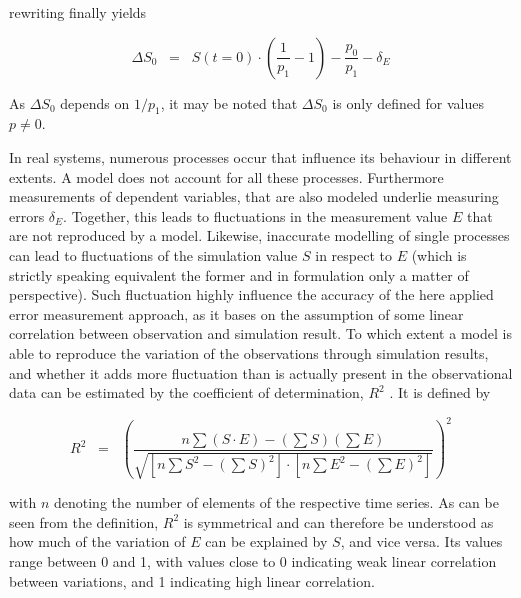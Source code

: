 \noindent rewriting finally yields

\begin{equation}
    \label{Eq-ErrMethDS0}
    \Delta S_0 \; \; = \; \; S(t\!=\!0) \cdot \left( \frac{1}{p_1} - 1 \right) - \frac{p_0}{p_1} - \delta_E
\end{equation}

As $\Delta S_0$ depends on $1/p_1$, it may be noted that $\Delta S_0$ is only defined for values $p \neq 0$.

In real systems, numerous processes occur that influence its behaviour in different extents. 
A model does not account for all these processes. 
Furthermore measurements of dependent variables, that are also modeled underlie measuring errors $\delta_E$. 
Together, this leads to fluctuations in the measurement value $E$ that are not reproduced by a model. 
Likewise, inaccurate modelling of single processes can lead to fluctuations of the simulation value $S$ in respect to $E$ (which is strictly speaking equivalent the former and in formulation only a matter of perspective). 
Such fluctuation highly influence the accuracy of the here applied error measurement approach, as it bases on the assumption of some linear correlation between observation and simulation result. 
To which extent a model is able to reproduce the variation of the observations through simulation results, and whether it adds more fluctuation than is actually present in the observational data can be estimated by the coefficient of determination, $R^2$ \parencite{Mosteller.1977}. 
It is defined by

\begin{equation}
    \label{Eq-R2}
    R^2 \; \; = \; \; \left( \frac{ n \sum (S \cdot E) - (\sum S) (\sum E) }{ \sqrt{ [ n \sum S^2 - (\sum S)^2 ] \cdot [ n \sum E^2 - (\sum E)^2 ] } } \right)^2
\end{equation}

with $n$ denoting the number of elements of the respective time series. 
As can be seen from the definition, $R^2$ is symmetrical and can therefore be understood as how much of the variation of $E$ can be explained by $S$, and vice versa. 
Its values range between 0 and 1, with values close to 0 indicating weak linear correlation between variations, and 1 indicating high linear correlation.

